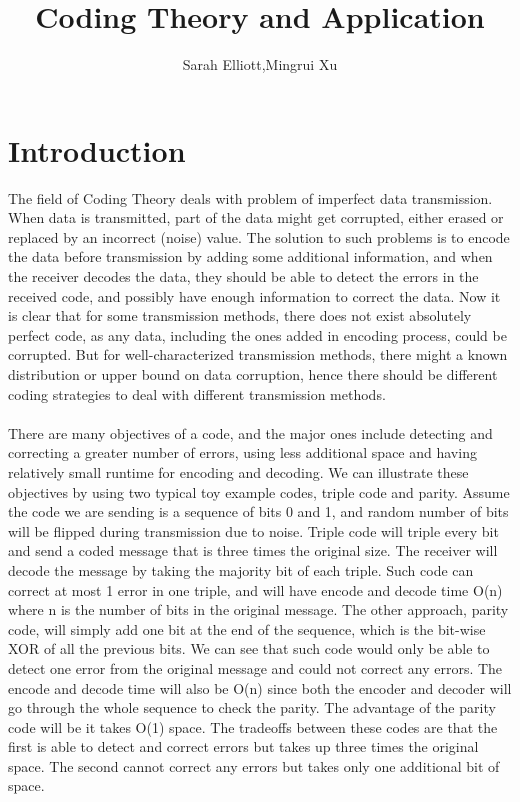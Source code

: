 \documentclass{article}
\author{Sarah Elliott,Mingrui Xu}
\title{Coding Theory and Application}
\begin{document}
\maketitle
\tableofcontents
\newpage

\section{Introduction}
The field of Coding Theory deals with problem of imperfect data transmission. When data is transmitted, part of the data might get corrupted, either erased or replaced by an incorrect (noise) value. The solution to such problems is to encode the data before transmission by adding some additional information, and when the receiver decodes the data, they should be able to detect the errors in the received code, and possibly have enough information to correct the data. Now it is clear that for some transmission methods, there does not exist absolutely perfect code, as any data, including the ones added in encoding process, could be corrupted. But for well-characterized transmission methods, there might a known distribution or upper bound on data corruption, hence there should be different coding strategies to deal with different transmission methods.\\\\
There are many objectives of a code, and the major ones include detecting and correcting a greater number of errors, using less additional space and having relatively small runtime for encoding and decoding. We can illustrate these objectives by using two typical toy example codes, triple code and parity. Assume the code we are sending is a sequence of bits 0 and 1, and random number of bits will be flipped during transmission due to noise. Triple code will triple every bit and send a coded message that is three times the original size. The receiver will decode the message by taking the majority bit of each triple. Such code can correct at most 1 error in one triple, and will have encode and decode time O(n) where n is the number of bits in the original message. The other approach, parity code, will simply add one bit at the end of the sequence, which is the bit-wise XOR of all the previous bits. We can see that such code would only be able to detect one error from the original message and could not correct any errors. The encode and decode time will also be O(n) since both the encoder and decoder will go through the whole sequence to check the parity. The advantage of the parity code will be it takes O(1) space. The tradeoffs between these codes are that the first is able to detect and correct errors but takes up three times the original space. The second cannot correct any errors but takes only one additional bit of space. \\
\end{document}
